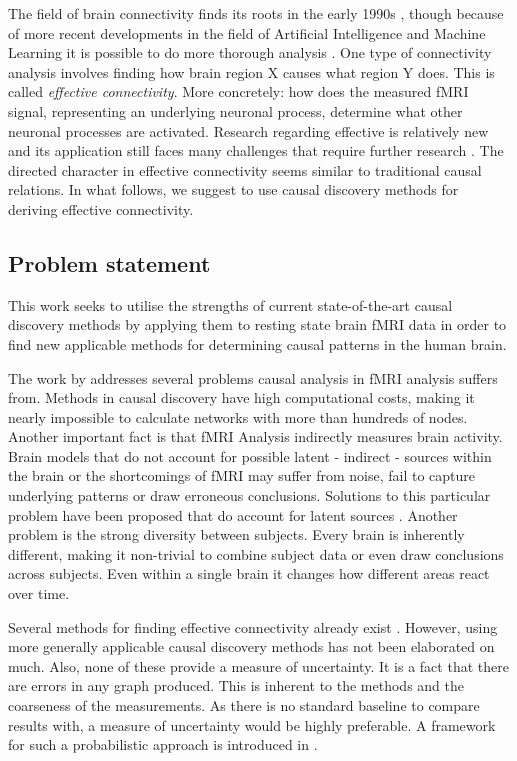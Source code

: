 \documentclass[a4paper, 10pt, english, onecolumn]{article}
\begin{document}
The field of brain connectivity finds its roots in the early 1990s \cite{friston1993functional, friston1994}, though because of more recent developments in the field of Artificial Intelligence and Machine Learning it is possible to do more thorough analysis \cite{vandenheuvel2010}.
One type of connectivity analysis involves finding how brain region X causes what region Y does. This is called \emph{effective connectivity}.
More concretely: how does the measured fMRI signal, representing an underlying neuronal process, determine what other neuronal processes are activated.
Research regarding effective is relatively new and its application still faces many challenges that require further research \cite{ramsey2010}.
The directed character in effective connectivity seems similar to traditional causal relations.
In what follows, we suggest to use causal discovery methods for deriving effective connectivity.

\subsection{Problem statement}
This work seeks to utilise the strengths of current state-of-the-art causal discovery methods by applying them to resting state brain fMRI data in order to find new applicable methods for determining causal patterns in the human brain.

The work by \cite{ramsey2010} addresses several problems causal analysis in fMRI analysis suffers from.
Methods in causal discovery have high computational costs, making it nearly impossible to calculate networks with more than hundreds of nodes.
Another important fact is that fMRI Analysis indirectly measures brain activity.
Brain models that do not account for possible latent - indirect - sources within the brain or the shortcomings of fMRI may suffer from noise, fail to capture underlying patterns or draw erroneous conclusions.
Solutions to this particular problem have been proposed that do account for latent sources \cite{ramsey2010, waldorp2011}.
Another problem is the strong diversity between subjects.
Every brain is inherently different, making it non-trivial to combine subject data or even draw conclusions across subjects.
Even within a single brain it changes how different areas react over time.

Several methods for finding effective connectivity already exist \cite{mclntosh1994, harrison2003, friston2003, roebroeck2005}.
However, using more generally applicable causal discovery methods has not been elaborated on much.
Also, none of these provide a measure of uncertainty.
It is a fact that there are errors in any graph produced.
This is inherent to the methods and the coarseness of the measurements.
As there is no standard baseline to compare results with, a measure of uncertainty would be highly preferable.
A framework for such a probabilistic approach is introduced in \cite{claassen2012}.
\end{document}
